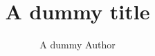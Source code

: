 \documentclass[ngerman]{article}
\title{A dummy title}
\author{A dummy Author}
\begin{document}
  \maketitle
  
  \tableofcontents 
  \pagebreak
  \printnoidxglossaries
  
  
  
  
  
  
\end{document}
